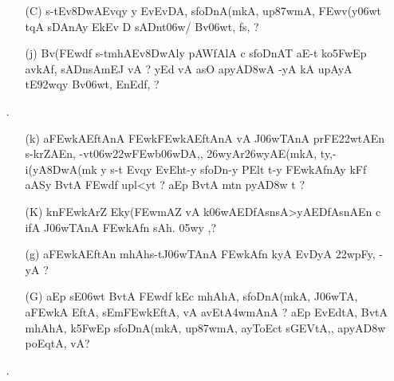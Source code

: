 \begin{itemize} 
\item[]		 \begin{itemize}         
          \item[({\dn C})] {\dn s\2-tEv\38DwAEvqy\? y\? EvEvDA, s\2foDnA(mkA, up\387wmA, \3FEwv(y\0\306wt\?{\rs ,\re} t\?qA\2 s\2DAnAy Ek\2Ev D\2 sADnt\306w/\2 Bv\306wt, f\2s\?, {\rs ?\re}}
          
          \item[({\dn j})] {\dn Bv(\3FEwd\?f\? s\2-tmhAEv\38DwAly\? pAWfAlA c s\2foDnAT\0 aE-t ko\35FwEp avkAf, sADnsAmEJ vA {\rs ?\re} yEd vA asO apyA\0\3D8wA -yA kA upAyA tE\392wqy\? Bv\306wt, EnEd\0f\?, {\rs ?\re} }
          
         \end{itemize}


\item[{\dn \dnnum \rn{24}}.] \begin{itemize}
           
          \item[({\dn k})] {\dn a\3FEwkAEftAnA\2 \3FEwk\3FEwkAEftAnA\2 vA J\306wTAnA\2 prFE\322w\-tAEn s\2-krZAEn{\rs ,\re} -vt\306w\322w\3FEwb\306wDA,{\rs ,\re} \326wyAr\326wyAE(mkA, ty,{\rs -\re}i(yA\38DwA(mk\2 y s\2-t\- Evqy\? EvEht-y s\2foDn-y PElt t-y \3FEwkAfnAy kFf aASy\2 BvtA\2 \3FEwd\?f\? upl<yt\? {\rs ?\re} aEp BvtA\2 mt\?n pyA\0\3D8w\2 t {\rs ?\re}} 
           
          \item[({\dn K})] {\dn k\?n\3FEwkAr\?Z Eky(\3FEwmAZ\2 vA k\?\306wAEDfAsn\2\break sA>yAEDfAsnAEn c ifA\2 J\306wTAnA\2 \3FEwkAfn\? sAh. \305wy\2 \0,{\rs ?\re}} 
          
          \item[({\dn g})] {\dn a\3FEwkAEftAn\2 mhAh\0s\2-tJ\306wTAnA\2 \3FEwkAfn\2 kyA EvDyA\2 \322w\?pFy, -yA {\rs ?\re} }
          
          \item[({\dn G})] {\dn aEp sE\306wt BvtA\2 \3FEwd\?f\? k\?Ec mhAhA\0, s\2foDnA(mkA, J\306wTA, a\3FEwkA\- EftA, sEm\3FEwkEftA, vA avEt\3A4wmAnA\2 {\rs ?\re} aEp EvEdtA, BvtA\2 mhAhA\0, k\?\35FwEp s\2foDnA(mkA, up\387wmA, ayToEct\2 s\2GEVtA,{\rs ,\re} apyA\0\3D8w\2 poEqtA, vA{\rs ?\re}}
          \end{itemize}

\item[{\dn \dnnum \rn{25}}.] \begin{itemize}
               

\end{itemize}
\end{itemize}
